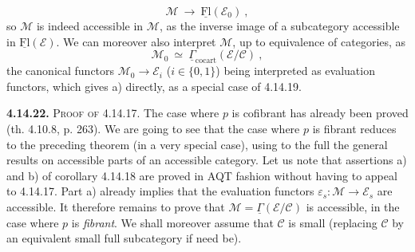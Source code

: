 \documentclass[11pt]{article}
\newcommand{\printedpage}[1]{\marginpar{\footnotesize p.~#1}}
\newcommand{\msp}[1]{\marginpar{\footnotesize [#1]}}
\newcommand{\uGamma}{\underline{\Gamma}}
\newcommand{\uFl}{\underline{\mathrm{Fl}}}
\newcommand{\cocart}{\mathrm{cocart}}
\begin{document}
\[
\mathcal{M} \ \longrightarrow \ \uFl(\mathcal{E}_0) \ ,
\]
so $\mathcal{M}$ is indeed accessible in $\mathcal{M}$, as the inverse image of a subcategory accessible in $\uFl(\mathcal{E})$. We can moreover also interpret $\mathcal{M}$, up to equivalence of categories, as %
\msp{page 400}
\[
\mathcal{M}_0 \ \simeq \ \uGamma_{\cocart}(\mathcal{E}/\mathcal{C}) \ ,
\]
the canonical functors $\mathcal{M}_0 \longrightarrow \mathcal{E}_i$ ($i \in \{0,1\}$) being interpreted as evaluation functors, which gives a) directly, as a special case of 4.14.19. %

\printedpage{152}

\textbf{4.14.22.} \textsc{Proof of} 4.14.17. The case where $p$ is cofibrant has already been proved (th. 4.10.8, p. 263). We are going to see that the case where $p$ is fibrant reduces to the preceding theorem (in a very special case), using to the full the general results on accessible parts of an accessible category. Let us note that assertions a) and b) of corollary 4.14.18 are proved in AQT fashion without having to appeal to 4.14.17. Part a) already implies that the evaluation functors $\varepsilon_s : \mathcal{M} \longrightarrow \mathcal{E}_s$ are accessible. It therefore remains to prove
\msp{page 401}
that $\mathcal{M} = \uGamma(\mathcal{E}/\mathcal{C})$ is accessible, in the case where $p$ is \textit{fibrant}. We shall moreover assume that $\mathcal{C}$ is small (replacing $\mathcal{C}$ by an equivalent small full subcategory if need be).
\end{document}
